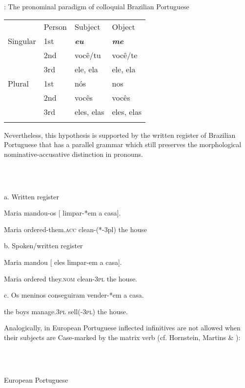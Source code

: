 \documentclass[output=paper]{langsci/langscibook}
\begin{document}
       : The pronominal paradigm of colloquial Brazilian Portuguese

\begin{tabularx}{\textwidth}{XXXX}
\lsptoprule

\multicolumn{1}{X}{Number}  & Person & Subject & Object\\
\multicolumn{1}{X}{Singular} & 1st & \textbf{\textit{eu}} & \textbf{\textit{me}}\\
& 2nd & você/tu & você/te\\
\hhline{~---} & 3rd & ele, ela & ele, ela\\
\multicolumn{1}{X}{Plural} & 1st & nós & nos\\
& 2nd & vocês & vocês\\
\hhline{~---} & 3rd & eles, elas & eles, elas\\
\hhline{~---}
\lspbottomrule
\end{tabularx}
Nevertheless, this hypothesis is supported by the written register of Brazilian Portuguese that has a parallel grammar which still preserves the morphological nominative-accusative distinction in pronouns.

\ea%
    \label{ex:moreno:24}
    \gll\\
        \\
    \glt
    \z

          a.  Written register

Maria mandou-os     [  limpar-*em    a    casa].   

    Maria ordered-them.\textsc{acc}       clean-(*-3pl) the house

  b.  Spoken/written register

Maria mandou [ eles   limpar-em a    casa].  

    Maria ordered    they.\textsc{nom} clean-\textsc{3pl}  the house.

c.  Os meninos conseguiram  vender-*em  a    casa.

     the boys      manage.\textsc{3pl}    sell(-\textsc{3pl})     the house.

Analogically, in European Portuguese inflected infinitives are not allowed when their subjects are Case-marked by the matrix verb (cf. Hornstein, Martins \& \citealt{Nunes2008}):

\ea%
    \label{ex:moreno:25}
    \gll\\
        \\
    \glt
    \z

          European Portuguese
\end{document}
